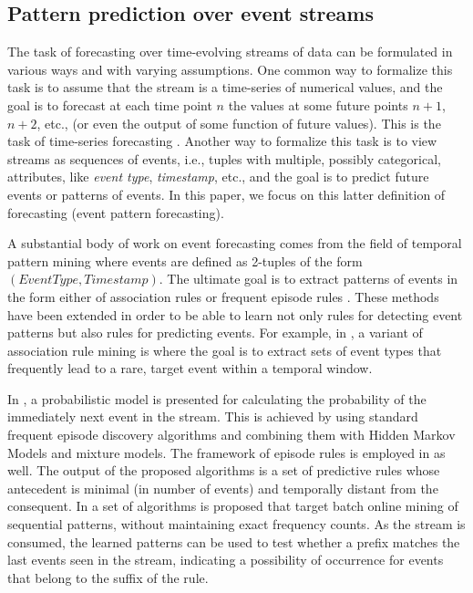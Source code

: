 

\subsection{Pattern prediction over event streams}

\par The task of forecasting over time-evolving streams of data can be formulated in various ways and with varying assumptions.
One common way to formalize this task is to assume that the stream is a time-series of numerical values, and the goal is to forecast at each time point $n$ the values at some future points $n+1$, $n+2$, etc., (or even the output of some function of future values). 
This is the task of time-series forecasting \cite{montgomery_introduction_2015}.
Another way to formalize this task is to view streams as sequences of events,
i.e., tuples with multiple, possibly categorical, attributes, like \textit{event type}, \textit{timestamp}, etc., and the goal is to predict future events or patterns of events. In this paper, we focus on this latter definition of forecasting (event pattern forecasting).  

\par A substantial body of work on event forecasting comes from the field of temporal pattern mining where events are defined as 2-tuples of the form $(\mathit{EventType},\mathit{Timestamp})$.
The ultimate goal is to extract patterns of events in the form either of association rules \cite{agrawal_mining_1993} or frequent episode rules \cite{mannila_discovery_1997}. 
These methods have been extended in order to be able to learn not only rules for detecting event patterns but also rules for predicting events.
For example, in \cite{vilalta_predicting_2002}, a variant of association rule mining is where the goal is to extract sets of event types that frequently lead to a rare, target event within a temporal window. 
\par In \cite{laxman_stream_2008}, a probabilistic model is presented
for calculating the probability of the immediately next event in the stream. 
This is achieved by using standard frequent episode discovery algorithms and combining them with Hidden Markov Models and mixture models.
The framework of episode rules is employed in \cite{fahed_efficient_2014} as well.
The output of the proposed algorithms is a set of predictive rules whose antecedent is minimal (in number of events) and temporally distant from the consequent.
In \cite{zhou_pattern_2015} a set of algorithms is proposed that target batch online mining of sequential patterns, without maintaining exact frequency counts.
As the stream is consumed, the learned patterns can be used to test whether a prefix matches the last events seen in the stream, indicating a possibility of occurrence for events that belong to the suffix of the rule.

